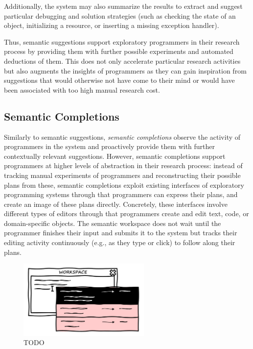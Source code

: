 	Additionally, the system may also summarize the results to extract and suggest particular debugging and solution strategies (such as checking the state of an object, initializing a resource, or inserting a missing exception handler).


\ParSep

Thus, semantic suggestions support exploratory programmers in their research process by providing them with further possible experiments and automated deductions of them.
This does not only accelerate particular research activities but also augments the insights of programmers as they can gain inspiration from suggestions that would otherwise not have come to their mind or would have been associated with too high manual research cost.

\subsection{Semantic Completions}
\label{sec:approach/workspace/completions}

Similarly to semantic suggestions, \emph{semantic completions} observe the activity of programmers in the system and proactively provide them with further contextually relevant suggestions.
However, semantic completions support programmers at higher levels of abstraction in their research process:
instead of tracking manual experiments of programmers and reconstructing their possible plans from these, semantic completions exploit existing interfaces of exploratory programming systems through that programmers can express their plans, and create an image of these plans directly.
Concretely, these interfaces involve different types of editors through that programmers create and edit text, code, or domain-specific objects.
The semantic workspace does not wait until the programmer finishes their input and submits it to the system but tracks their editing activity continuously (e.g., as they type or click) to follow along their plans.

\begin{figure}
	\centering
	\includegraphics[width=0.58\textwidth]{02_workspace/completions.png}
	\caption[TODO]{
		TODO
	}
	\label{fig:approach/workspace/completions}
\end{figure}


